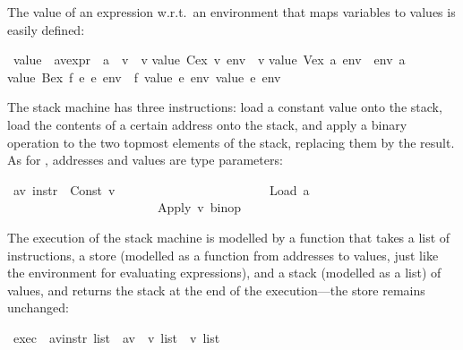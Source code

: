 \begin{isabellebody}
\begin{isamarkuptext}
The value of an expression w.r.t.\ an environment that maps variables to
values is easily defined:%
\end{isamarkuptext}%
\ value\ {\isacharcolon}{\isacharcolon}\ {\isachardoublequote}{\isacharparenleft}{\isacharprime}a{\isacharcomma}{\isacharprime}v{\isacharparenright}expr\ {\isasymRightarrow}\ {\isacharparenleft}{\isacharprime}a\ {\isasymRightarrow}\ {\isacharprime}v{\isacharparenright}\ {\isasymRightarrow}\ {\isacharprime}v{\isachardoublequote}\isanewline
{}\isanewline
{\isachardoublequote}value\ {\isacharparenleft}Cex\ v{\isacharparenright}\ env\ {\isacharequal}\ v{\isachardoublequote}\isanewline
{\isachardoublequote}value\ {\isacharparenleft}Vex\ a{\isacharparenright}\ env\ {\isacharequal}\ env\ a{\isachardoublequote}\isanewline
{\isachardoublequote}value\ {\isacharparenleft}Bex\ f\ e\ e\ env\ {\isacharequal}\ f\ {\isacharparenleft}value\ e\ env{\isacharparenright}\ {\isacharparenleft}value\ e\ env{\isacharparenright}{\isachardoublequote}%
\begin{isamarkuptext}%
The stack machine has three instructions: load a constant value onto the
stack, load the contents of a certain address onto the stack, and apply a
binary operation to the two topmost elements of the stack, replacing them by
the result. As for , addresses and values are type parameters:%
\end{isamarkuptext}%
\ {\isacharparenleft}{\isacharprime}a{\isacharcomma}{\isacharprime}v{\isacharparenright}\ instr\ {\isacharequal}\ Const\ {\isacharprime}v\isanewline
\ \ \ \ \ \ \ \ \ \ \ \ \ \ \ \ \ \ \ \ \ \ \ {\isacharbar}\ Load\ {\isacharprime}a\isanewline
\ \ \ \ \ \ \ \ \ \ \ \ \ \ \ \ \ \ \ \ \ \ \ {\isacharbar}\ Apply\ {\isachardoublequote}{\isacharprime}v\ binop{\isachardoublequote}%
\begin{isamarkuptext}%
The execution of the stack machine is modelled by a function
 that takes a list of instructions, a store (modelled as a
function from addresses to values, just like the environment for
evaluating expressions), and a stack (modelled as a list) of values,
and returns the stack at the end of the execution---the store remains
unchanged:%
\end{isamarkuptext}%
\ exec\ {\isacharcolon}{\isacharcolon}\ {\isachardoublequote}{\isacharparenleft}{\isacharprime}a{\isacharcomma}{\isacharprime}v{\isacharparenright}instr\ list\ {\isasymRightarrow}\ {\isacharparenleft}{\isacharprime}a{\isasymRightarrow}{\isacharprime}v{\isacharparenright}\ {\isasymRightarrow}\ {\isacharprime}v\ list\ {\isasymRightarrow}\ {\isacharprime}v\ list{\isachardoublequote}\isanewline

\end{isabellebody}
